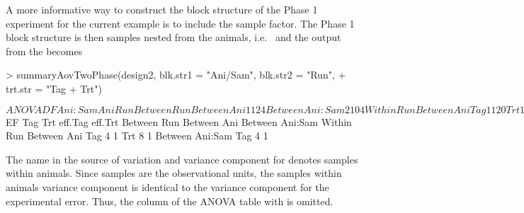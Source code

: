 \documentclass[article]{jss}
\begin{document}
A more informative way to construct the block structure of the Phase 1 experiment for the current example is to include the sample factor. The Phase 1 block structure is then samples nested from the animals, i.e.\  and the output from the  becomes
\begin{CodeChunk}
\begin{CodeInput}
> summaryAovTwoPhase(design2, blk.str1 = "Ani/Sam", blk.str2 = "Run", 
+  trt.str = "Tag + Trt")                                    
\end{CodeInput}
\begin{CodeOutput}
$ANOVA
                   DF Ani:Sam Ani Run
Between Run                          
   Between Ani     1  1       2   4  
   Between Ani:Sam 2  1       0   4  
Within Run                           
   Between Ani                       
      Tag          1  1       2   0  
      Trt          1  1       2   0  
      Residual     4  1       2   0  
   Between Ani:Sam                   
      Tag          2  1       0   0  
      Residual     4  1       0   0  
$EF
                   Tag Trt eff.Tag eff.Trt
Between Run                               
   Between Ani                            
   Between Ani:Sam                        
Within Run                                
   Between Ani                            
      Tag          4       1              
      Trt              8           1      
   Between Ani:Sam                        
      Tag          4       1               
\end{CodeOutput}
\end{CodeChunk}
The name in the source of variation and variance component for  denotes samples within animals. Since samples are the observational units, the samples within animals variance component is identical to the variance component for the experimental error. Thus, the column of the ANOVA table with  is omitted.
\end{document}

